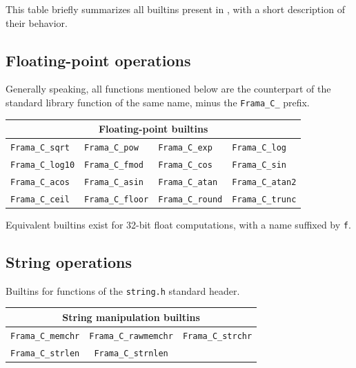 \documentclass{frama-c-book}
\begin{document}
This table briefly summarizes all builtins present in \Eva{}, with
a short description of their behavior.

\subsection{Floating-point operations}

Generally speaking, all functions mentioned below are the counterpart of the
standard library function of the same name, minus the
\lstinline|Frama_C_| prefix.

\begin{table}[!ht]
  \centering
  \begin{tabular}{llll}
    \multicolumn{4}{c}{Floating-point builtins} \\
    \hline
    \lstinline|Frama_C_sqrt| &
    \lstinline|Frama_C_pow| &
    \lstinline|Frama_C_exp| &
    \lstinline|Frama_C_log| \\
    \lstinline|Frama_C_log10| &
    \lstinline|Frama_C_fmod| &
    \lstinline|Frama_C_cos| &
    \lstinline|Frama_C_sin| \\
    \lstinline|Frama_C_acos| &
    \lstinline|Frama_C_asin| &
    \lstinline|Frama_C_atan| &
    \lstinline|Frama_C_atan2| \\
    \lstinline|Frama_C_ceil| &
    \lstinline|Frama_C_floor| &
    \lstinline|Frama_C_round| &
    \lstinline|Frama_C_trunc|
  \end{tabular}
\end{table}
Equivalent builtins exist for 32-bit float computations, with a name suffixed
by \lstinline|f|.

\subsection{String operations}

Builtins for functions of the \lstinline|string.h| standard header.

\begin{table}[!ht]
  \centering
  \begin{tabular}{ccc}
    \multicolumn{3}{c}{String manipulation builtins} \\
    \hline
    \lstinline|Frama_C_memchr| &
    \lstinline|Frama_C_rawmemchr| &
    \lstinline|Frama_C_strchr| \\
    \lstinline|Frama_C_strlen| &
    \lstinline|Frama_C_strnlen|
  \end{tabular}
\end{table}
\end{document}
